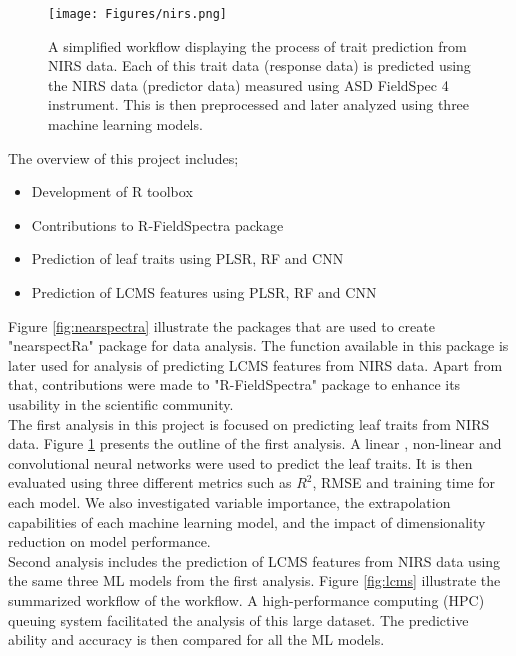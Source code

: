 \documentclass[12pt,a4paper]{report}
\begin{document}
\begin{figure}[h]
    \centering
    \texttt{[image: Figures/nirs.png]}
    \caption{A simplified workflow displaying the process of trait prediction from NIRS data. Each of this trait data (response data) is predicted using the NIRS data (predictor data) measured using ASD FieldSpec 4 instrument. This is then preprocessed and later analyzed using three machine learning models.}
    \label{fig:nirs_workflow}
\end{figure}

The overview of this project includes;
\begin{itemize}
    \item Development of R toolbox 
    \item Contributions to R-FieldSpectra package
    \item Prediction of leaf traits using PLSR, RF and CNN
    \item Prediction of LCMS features using PLSR, RF and CNN
\end{itemize}



Figure \ref{fig:nearspectra} illustrate the packages that are used to create "nearspectRa" package for data analysis. The function available in this package is later used for analysis of predicting LCMS features from NIRS data. Apart from that, contributions were made to "R-FieldSpectra" package to enhance its usability in the scientific community. \\

The first analysis in this project is focused on predicting leaf traits from NIRS data. Figure \ref{fig:nirs_workflow} presents the outline of the first analysis. A linear , non-linear and convolutional neural networks were used to predict the leaf traits. It is then evaluated using three different metrics such as $R^2$, RMSE and training time for each model. We also investigated variable importance, the extrapolation capabilities of each machine learning model, and the impact of dimensionality reduction on model performance. \\

Second analysis includes the prediction of LCMS features from NIRS data using the same three ML models from the first analysis. Figure \ref{fig:lcms} illustrate the summarized workflow of the workflow. A high-performance computing (HPC) queuing system facilitated the analysis of this large dataset. The predictive ability and accuracy is then compared for all the ML models. \\
\end{document}
